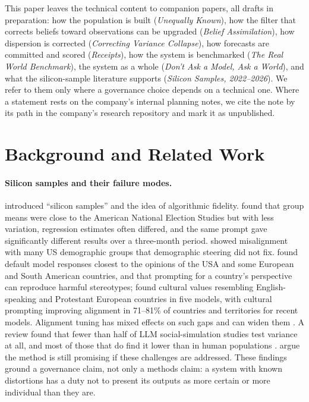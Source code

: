 \documentclass[11pt]{article}
\begin{document}
This paper leaves the technical content to companion papers, all drafts in preparation: how the population is built (\emph{Unequally Known}), how the filter that corrects beliefs toward observations can be upgraded (\emph{Belief Assimilation}), how dispersion is corrected (\emph{Correcting Variance Collapse}), how forecasts are committed and scored (\emph{Receipts}), how the system is benchmarked (\emph{The Real World Benchmark}), the system as a whole (\emph{Don't Ask a Model, Ask a World}), and what the silicon-sample literature supports (\emph{Silicon Samples, 2022--2026}). We refer to them only where a governance choice depends on a technical one. Where a statement rests on the company's internal planning notes, we cite the note by its path in the company's research repository and mark it as unpublished.

\section{Background and Related Work}

\paragraph{Silicon samples and their failure modes.} \citet{argyle2023outofone} introduced ``silicon samples'' and the idea of algorithmic fidelity. \citet{bisbee2024synthetic} found that group means were close to the American National Election Studies but with less variation, regression estimates often differed, and the same prompt gave significantly different results over a three-month period. \citet{santurkar2023whose} showed misalignment with many US demographic groups that demographic steering did not fix. \citet{durmus2023global} found default model responses closest to the opinions of the USA and some European and South American countries, and that prompting for a country's perspective can reproduce harmful stereotypes; \citet{tao2023cultural} found cultural values resembling English-speaking and Protestant European countries in five models, with cultural prompting improving alignment in 71--81\% of countries and territories for recent models. Alignment tuning has mixed effects on such gaps and can widen them \citep{ryan2024unintended}. A review found that fewer than half of LLM social-simulation studies test variance at all, and most of those that do find it lower than in human populations \citep{wu2025boundary}. \citet{anthis2025promising} argue the method is still promising if these challenges are addressed. These findings ground a governance claim, not only a methods claim: a system with known distortions has a duty not to present its outputs as more certain or more individual than they are.
\end{document}
